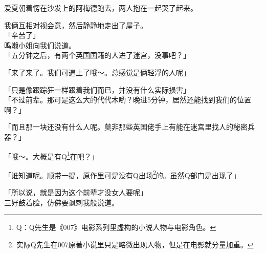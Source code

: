 爱夏朝着愣在沙发上的阿梅德跑去，两人抱在一起哭了起来。

我俩互相对视会意，然后静静地走出了屋子。\\

「辛苦了」\\

鸣濑小姐向我们说道。\\

「五分钟之后，有两个英国国籍的人进了迷宫，没事吧？」

「来了来了。我们可遇上了哦～。总感觉是俩轻浮的人呢」

「只是像跟踪狂一样跟着我们而已，并没有什么实际损害」\\

「不过前辈。那可是这么大的代代木哟？晚进5分钟，居然还能找到我们的位置啊？」

「而且那一块还没有什么人呢。莫非那些英国佬手上有能在迷宫里找人的秘密兵器？」

「哦～。大概是有Q\footnote{Q：Q先生是《007》电影系列里虚构的小说人物与电影角色。}在吧？」

「谁知道呢。顺带一提，原作里可是没有Q出场\footnote{实际Q先生在007原著小说里只是略微出现人物，但是在电影就分量加重。}的。虽然Q部门是出现了」

「所以说，就是因为这个前辈才没女人要呢」\\

三好鼓着脸，仿佛要讽刺我般说道。\\

